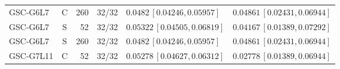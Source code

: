 \begin{longtable}{lcrcp{44mm}p{44mm}}
GSC-G6L7 & C & 260 & 32/32 & \(0.0482\,[0.04246,0.05957]\) & \(0.04861\,[0.02431,0.06944]\)\\
GSC-G6L7 & S & 52 & 32/32 & \(0.05322\,[0.04505,0.06819]\) & \(0.04167\,[0.01389,0.07292]\)\\
GSC-G6L7 & S & 260 & 32/32 & \(0.0482\,[0.04246,0.05957]\) & \(0.04861\,[0.02431,0.06944]\)\\
GSC-G7L11 & C & 52 & 32/32 & \(0.05278\,[0.04627,0.06312]\) & \(0.02778\,[0.01389,0.06944]\)\\

\end{longtable}
